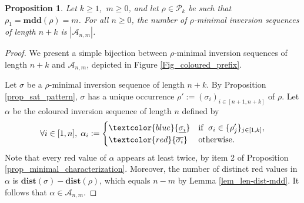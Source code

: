 \documentclass[a4paper,11pt]{article}
\newtheorem{prop}[thm]{Proposition}
\theoremstyle{definition}
\theoremstyle{remark}
\renewcommand{\P}{\mathcal{P}}
\newcommand{\mdd}{\mathbf{mdd}}
\newcommand{\dist}{\mathbf{dist}}
\newcommand{\tc}{\textcolor}
\renewcommand{\b}[1]{\tc{blue}{\underline{#1}}}
\renewcommand{\r}[1]{\tc{red}{\overline{#1}}}
\begin{document}
\begin{prop} \label{prop_coloured_prefix}
    Let $k \geq 1$, $\,m \geq 0$, and let $\rho \in \P_k$ be such that $\rho_1 = \mdd(\rho) = m$.
    For all $n \geq 0$, the number of $\rho$-minimal inversion sequences of length $n+k$ is $|\mathcal A_{n,m}|$.
\end{prop} 
\begin{proof}
    We present a simple bijection between $\rho$-minimal inversion sequences of length $n+k$ and $\mathcal A_{n,m}$, depicted in Figure \ref{Fig_coloured_prefix}.

     Let $\sigma$ be a $\rho$-minimal inversion sequence of length $n+k$. By Proposition \ref{prop_sat_pattern}, $\sigma$ has a unique occurrence $\rho' := (\sigma_{i})_{i \in [n+1,n+k]}$ of $\rho$. Let $\alpha$ be the coloured inversion sequence of length $n$ defined by 
     $$\forall i \in [1,n], \;\alpha_i := \begin{cases}
         \b{\sigma_i} & \text{if } \; \sigma_i \in \{\rho'_j\}_{j \in [1,k]}, \\
         \r{\sigma_i} & \text{otherwise}.
     \end{cases}$$
    Note that every red value of $\alpha$ appears at least twice, by item 2 of Proposition \ref{prop_minimal_characterization}. Moreover, the number of distinct red values in $\alpha$ is $\dist(\sigma) - \dist(\rho)$, which equals $n-m$ by Lemma \ref{lem_len-dist-mdd}.
    It follows that $\alpha \in \mathcal A_{n,m}$.
    

\end{proof}
\end{document}
